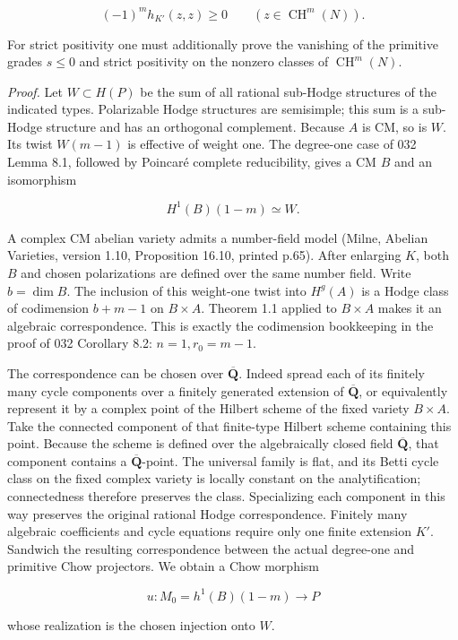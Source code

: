 \documentclass[11pt,a4paper]{article}
\begin{document}
\[
(-1)^m h_{K'}(z,z)\ge0
\qquad(z\in\operatorname{CH}^m(N)).
\tag{AR-GATE}
\]

For strict positivity one must additionally prove the vanishing of the
primitive grades \(s\le0\) and strict positivity on the nonzero classes
of \(\operatorname{CH}^m(N)\).

\emph{Proof.} Let \(W\subset H(P)\) be the sum of all rational sub-Hodge
structures of the indicated types. Polarizable Hodge structures are
semisimple; this sum is a sub-Hodge structure and has an orthogonal
complement. Because \(A\) is CM, so is \(W\). Its twist \(W(m-1)\) is
effective of weight one. The degree-one case of 032 Lemma 8.1, followed
by Poincaré complete reducibility, gives a CM \(B\) and an isomorphism

\[
H^1(B)(1-m)\simeq W.
\]

A complex CM abelian variety admits a number-field model (Milne, Abelian
Varieties, version 1.10, Proposition 16.10, printed p.65). After
enlarging \(K\), both \(B\) and chosen polarizations are defined over
the same number field. Write \(b=\dim B\). The inclusion of this
weight-one twist into \(H^g(A)\) is a Hodge class of codimension
\(b+m-1\) on \(B\times A\). Theorem 1.1 applied to \(B\times A\) makes
it an algebraic correspondence. This is exactly the codimension
bookkeeping in the proof of 032 Corollary 8.2: \(n=1,r_0=m-1\).

The correspondence can be chosen over \(\overline{\mathbf Q}\). Indeed
spread each of its finitely many cycle components over a finitely
generated extension of \(\overline{\mathbf Q}\), or equivalently
represent it by a complex point of the Hilbert scheme of the fixed
variety \(B\times A\). Take the connected component of that finite-type
Hilbert scheme containing this point. Because the scheme is defined over
the algebraically closed field \(\overline{\mathbf Q}\), that component
contains a \(\overline{\mathbf Q}\)-point. The universal family is flat,
and its Betti cycle class on the fixed complex variety is locally
constant on the analytification; connectedness therefore preserves the
class. Specializing each component in this way preserves the original
rational Hodge correspondence. Finitely many algebraic coefficients and
cycle equations require only one finite extension \(K'\). Sandwich the
resulting correspondence between the actual degree-one and primitive
Chow projectors. We obtain a Chow morphism

\[
u:M_0=h^1(B)(1-m)\longrightarrow P
\]

whose realization is the chosen injection onto \(W\).
\end{document}
